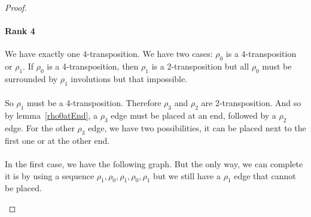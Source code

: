 \begin{proof}
  \paragraph{Rank 4}
  We have exactly one 4-transposition. We have two cases: $\rho_0$ is a 4-transposition or $\rho_1$. If $\rho_0$ is a 4-transposition, then $\rho_1$ is a 2-transposition but all $\rho_0$ must be surrounded by $\rho_1$ involutions but that impossible.

  \paragraph{}
  So $\rho_1$ must be a 4-transposition. Therefore $\rho_3$ and $\rho_2$ are 2-transposition. And so by lemma~\ref{rho0atEnd}, a $\rho_3$ edge must be placed at an end, followed by a $\rho_2$ edge. For the other $\rho_3$ edge, we have two possibilities, it can be placed next to the first one or at the other end.

  \paragraph{}
  In the first case, we have the following graph. But the only way, we can complete it is by using a sequence $\rho_1, \rho_0, \rho_1, \rho_0, \rho_1$ but we still have a $\rho_1$ edge that cannot be placed.

  \begin{figure}[H]
    \begin{center}
\end{center}
\end{figure}
\end{proof}
